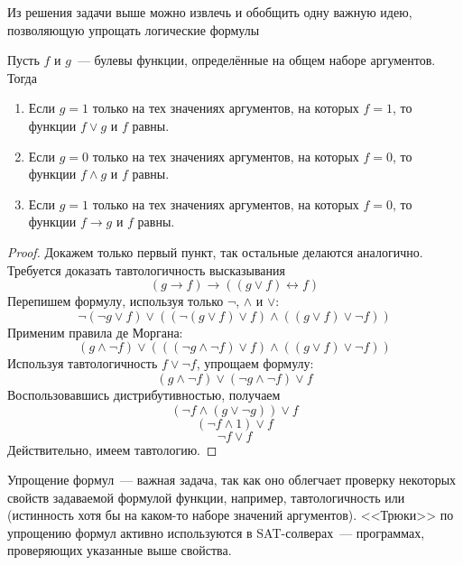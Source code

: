 


Из решения задачи выше можно извлечь и обобщить одну важную идею, позволяющую упрощать логические формулы
\begin{lemma}
    Пусть $ f $ и $ g $~--- булевы функции, определённые на общем наборе аргументов.
    Тогда
    \begin{enumerate}[label=\arabic*)]
        \item Если $ g = 1 $ только на тех значениях аргументов, на которых $ f = 1 $, то функции $ f \vee g $ и $ f $ равны.
        \item Если $ g = 0 $ только на тех значениях аргументов, на которых $ f = 0 $, то функции $ f \wedge g $ и $ f $ равны.
        \item Если $ g = 1 $ только на тех значениях аргументов, на которых $ f = 0 $, то функции $ f \rightarrow g $ и $ f $ равны.
    \end{enumerate}
\end{lemma}

\begin{proof}
    Докажем только первый пункт, так остальные делаются аналогично.
    Требуется доказать тавтологичность высказывания
    \[
        (g \rightarrow f) \rightarrow ((g \vee f) \leftrightarrow f)
    \]
    Перепишем формулу, используя только $ \neg $, $ \wedge $ и $ \vee $:
    \[
        \neg (\neg g \vee f) \vee ((\neg (g \vee f) \vee f) \wedge ((g \vee f) \vee \neg f))
    \]
    Применим правила де Моргана:
    \[
        (g \wedge \neg f) \vee (((\neg g \wedge \neg f) \vee f) \wedge ((g \vee f) \vee \neg f))
    \]
    Используя тавтологичность $ f \vee \neg f $, упрощаем формулу:
    \[
        (g \wedge \neg f) \vee (\neg g \wedge \neg f) \vee f
    \]
    Воспользовавшись дистрибутивностью, получаем
    \[
        (\neg f \wedge (g \vee \neg g)) \vee f
    \]
    \[
        (\neg f \wedge 1) \vee f
    \]
    \[
        \neg f \vee f
    \]
    Действительно, имеем тавтологию.
\end{proof}

Упрощение формул~--- важная задача, так как оно облегчает проверку некоторых свойств задаваемой формулой функции, например,
тавтологичность или  (истинность хотя бы на каком-то наборе значений аргументов).
<<Трюки>> по упрощению формул активно используются в SAT-солверах~--- программах, проверяющих указанные выше свойства.

